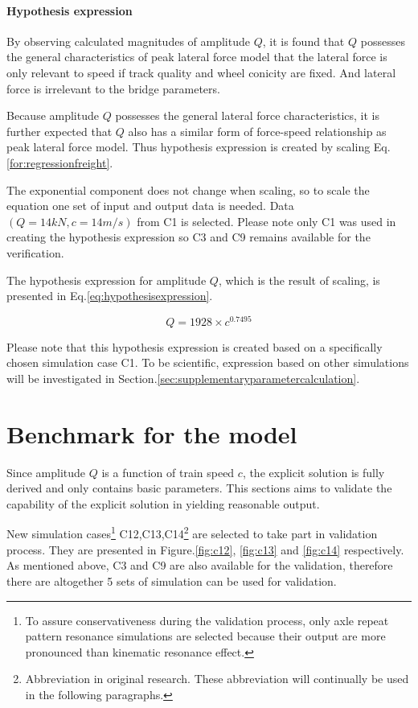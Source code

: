 \paragraph{Hypothesis expression}By observing calculated magnitudes of amplitude $Q$, it is found that $Q$ possesses the general characteristics of peak lateral force model that the lateral force is only relevant to speed if track quality and wheel conicity are fixed. And lateral force is irrelevant to the bridge parameters.
 
Because amplitude $Q$ possesses the general lateral force characteristics, it is further expected that $Q$ also has a similar form of force-speed relationship as peak lateral force model. Thus hypothesis expression is created by scaling Eq.\ref{for:regressionfreight}. 

The exponential component does not change when scaling, so to scale the equation one set of input and output data is needed. Data $(Q = 14kN, c=14m/s)$ from C1 is selected. Please note only C1 was used in creating the hypothesis expression so C3 and C9 remains available for the verification.

The hypothesis expression for amplitude $Q$, which is the result of scaling, is presented in Eq.\ref{eq:hypothesisexpression}.

\begin{equation}\label{eq:hypothesisexpression}
    Q= 1928\times c^{0.7495}
\end{equation}

Please note that this hypothesis expression is created based on a specifically chosen simulation case C1. To be scientific, expression based on other simulations will be investigated in Section.\ref{sec:supplementaryparametercalculation}.

\section{Benchmark for the model}
Since amplitude $Q$ is a function of train speed $c$, the explicit solution is fully derived and only contains basic parameters. This sections aims to validate the capability of the explicit solution in yielding reasonable output.

New simulation cases\footnote{To assure conservativeness during the validation process, only axle repeat pattern resonance simulations are selected because their output are more pronounced than kinematic resonance effect.\citep{d181dt329}} C12,C13,C14\footnote{Abbreviation in original research. These abbreviation will continually be used in the following paragraphs.} are selected to take part in validation process. They are presented in Figure.\ref{fig:c12}, \ref{fig:c13} and \ref{fig:c14} respectively. As mentioned above, C3 and C9 are also available for the validation, therefore there are altogether 5 sets of simulation can be used for validation.

